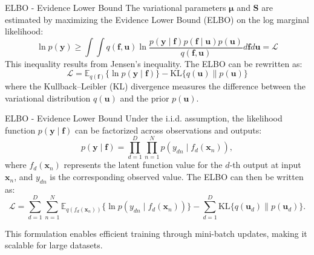 \begin{frame}{ELBO - Evidence Lower Bound}
	The variational parameters $\boldsymbol{\mu}$ and $\boldsymbol{S}$ are estimated by maximizing the Evidence Lower Bound (ELBO) on the log marginal likelihood:
	\[
	\ln p(\mathbf{y}) \geq \int \int q(\mathbf{f}, \mathbf{u}) \ln \frac{p(\mathbf{y} \mid \mathbf{f}) p(\mathbf{f}\mid \mathbf{u}) p(\mathbf{u})}{q(\mathbf{f}, \mathbf{u})} d\mathbf{f} d\mathbf{u} = \mathcal{L}
	\]
	This inequality results from Jensen's inequality. The ELBO can be rewritten as:
	\[
	\mathcal{L} = \mathbb{E}_{q(\mathbf{f})}\{\ln p(\mathbf{y} \mid \mathbf{f})\} - \text{KL}\{q(\mathbf{u})\parallel p(\mathbf{u})\}
	\]
	where the Kullback–Leibler (KL) divergence measures the difference between the variational distribution $q(\mathbf{u})$ and the prior $p(\mathbf{u})$.
\end{frame}

\begin{frame}{ELBO - Evidence Lower Bound}
	Under the i.i.d. assumption, the likelihood function $p(\mathbf{y} \mid \mathbf{f})$ can be factorized across observations and outputs:
	\begin{equation*}
		p(\mathbf{y} \mid \mathbf{f}) = \prod_{d=1}^D \prod_{n=1}^N p(y_{dn} \mid f_d(\mathbf{x}_n)),
	\end{equation*}
	where $f_d(\mathbf{x}_n)$ represents the latent function value for the $d$-th output at input $\mathbf{x}_n$, and $y_{dn}$ is the corresponding observed value. The ELBO can then be written as:
	\begin{equation*}
		\mathcal{L} = \sum_{d=1}^D \sum_{n=1}^N \mathbb{E}_{q(f_d(\mathbf{x}_n))}\{\ln p(y_{dn} \mid f_d(\mathbf{x}_n))\} - \sum_{d=1}^D \text{KL}\{q(\mathbf{u}_d) \parallel p(\mathbf{u}_d)\}.
	\end{equation*}
	
	This formulation enables efficient training through mini-batch updates, making it scalable for large datasets.
\end{frame}


